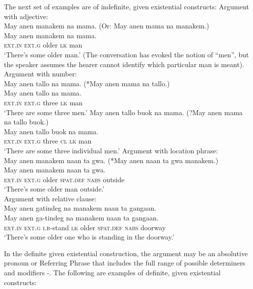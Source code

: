 The next set of examples are of indefinite, given existential constructs: 
\ea
\label{bkm:Ref442938671}
Argument with adjective: \\
May  anen  manakem  na  mama. (Or: May anen mama na manakem.) \\\smallskip
\gll  May  anen  manakem  na  mama. \\
\textsc{ext.in}  \textsc{ext.g}  older  \textsc{lk}  man \\
\glt ‘There’s some older man.’ (The conversation has evoked the notion of “men”, but the speaker assumes the hearer cannot identify 
which particular man is meant).
\z
\ea
Argument with number: \\
May  anen  tallo  na  mama. (*May anen mama na tallo.) \\\smallskip
\gll  May  anen  tallo  na  mama. \\
\textsc{ext.in  ext.g}  three  \textsc{lk}  man \\
\glt ‘There are some three men.’
\z
\ea
May  anen  tallo  buok  na  mama. (?May anen mama na tallo buok.) \\\smallskip
\gll May  anen  tallo  buok  na  mama. \\
\textsc{ext.in}  \textsc{ext.g}  three  \textsc{cl}    \textsc{lk}  man \\
\glt ‘There are some three individual men.’
\z
\ea
Argument with location phrase: \\
May  anen  manakem  naan  ta  gwa. (*May anen naan ta gwa manakem.) \\\smallskip
\gll  May  anen  manakem  naan  ta  gwa. \\
\textsc{ext.in}  \textsc{ext.g}  older  \textsc{spat.def}  \textsc{nabs}  outside \\
\glt ‘There’s some older man outside.’ \\
\z
\ea
Argument with relative clause: \\
May  anen  gatindeg  na  manakem  naan  ta    gangaan. \\\smallskip
\gll  May  anen  ga-tindeg  na  manakem  naan  ta    gangaan. \\
\textsc{ext.in}  \textsc{ext.g}  \textsc{i.r}-stand  \textsc{lk}  older    \textsc{spat.def}  \textsc{nabs}  doorway \\
\glt ‘There’s some older one who is standing in the doorway.’
\z

In the definite given existential construction, the argument may be an absolutive pronoun or Referring Phrase that includes the full range of possible determiners and modifiers -. The following are examples of definite, given existential constructs:
 
